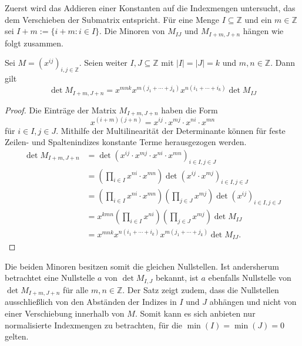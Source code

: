 Zuerst wird das Addieren einer Konstanten auf die Indexmengen untersucht, das dem Verschieben der Submatrix entspricht. Für eine Menge $I \subseteq \mathbb{Z}$ und ein $m \in \mathbb{Z}$ sei $I+m := \{i+m:i\in I\}$. Die Minoren von $M_{IJ}$ und $M_{I+m,J+n}$ hängen wie folgt zusammen.

\begin{satz} \label{satz:translation}
    Sei $M = \left( x^{ij} \right)_{i,j \in \mathbb{Z}}$. Seien weiter $I,J \subseteq \mathbb{Z}$ mit $|I|=|J|=k$ und $m,n \in \mathbb{Z}$. Dann gilt
    \begin{equation*}
        \det{} M_{I+m,J+n} = x^{mnk} x^{m(j_1 +\cdots + j_k)} x^{n(i_1+\cdots +i_k)} \det{} M_{IJ}
    \end{equation*}
\end{satz}

\begin{proof}
    Die Einträge der Matrix $M_{I+m,J+n}$ haben die Form 
    \begin{equation*}
        x^{(i+m)(j+n)} = x^{ij} \cdot x^{mj} \cdot x^{ni} \cdot x^{mn} 
    \end{equation*} für $i\in I, j\in J$. Mithilfe der Multilinearität der Determinante können für feste Zeilen- und Spaltenindizes konstante Terme herausgezogen werden.
    \begin{align*}
        \det M_{I+m,J+n}    &= \det \left(x^{ij} \cdot x^{mj} \cdot x^{ni} \cdot x^{mn} \right)_{i\in I,j\in J} \\ 
                            &= \left( \prod_{i \in I} x^{ni} \cdot x^{mn}\right) \det \left(x^{ij} \cdot x^{mj} \right)_{i\in I,j\in J} \\ 
                            &= \left( \prod_{i \in I} x^{ni} \cdot x^{mn}\right) \left( \prod_{j \in J} x^{mj}\right) \det \left(x^{ij}\right)_{i\in I,j\in J} \\ 
                            &= x^{kmn} \left( \prod_{i \in I} x^{ni}\right) \left( \prod_{j \in J} x^{mj}\right) \det M_{IJ} \\ 
                            &= x^{mnk} x^{n(i_1 +\cdots +i_k)} x^{m(j_1+\cdots +j_k)} \det M_{IJ}.
    \end{align*}
\end{proof}

Die beiden Minoren besitzen somit die gleichen Nullstellen. Ist andersherum betrachtet eine Nullstelle $a$ von $\det M_{I,J}$ bekannt, ist $a$ ebenfalls Nullstelle von $\det M_{I+m,J+n}$ für alle $m,n \in \mathbb{Z}$. Der Satz zeigt zudem, dass die Nullstellen ausschließlich von den Abständen der Indizes in $I$ und $J$ abhängen und nicht von einer Verschiebung innerhalb von $M$. Somit kann es sich anbieten nur normalisierte Indexmengen zu betrachten, für die $\min(I) = \min(J) = 0$ gelten.

